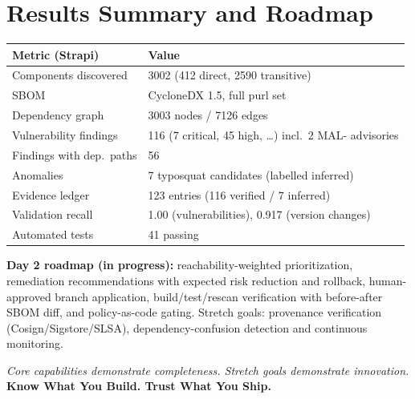 \documentclass[11pt,a4paper]{article}
\begin{document}
\section{Results Summary and Roadmap}

\begin{center}
\small
\begin{tabular}{@{}ll@{}}
\toprule
\textbf{Metric (Strapi)} & \textbf{Value} \\
\midrule
Components discovered      & 3002 (412 direct, 2590 transitive) \\
SBOM                       & CycloneDX 1.5, full purl set \\
Dependency graph           & 3003 nodes / 7126 edges \\
Vulnerability findings     & 116 (7 critical, 45 high, \dots) incl.\ 2 MAL- advisories \\
Findings with dep.\ paths  & 56 \\
Anomalies                  & 7 typosquat candidates (labelled inferred) \\
Evidence ledger            & 123 entries (116 verified / 7 inferred) \\
Validation recall          & 1.00 (vulnerabilities), 0.917 (version changes) \\
Automated tests            & 41 passing \\
\bottomrule
\end{tabular}
\end{center}

\textbf{Day 2 roadmap (in progress):} reachability-weighted prioritization, remediation
recommendations with expected risk reduction and rollback, human-approved branch
application, build/test/rescan verification with before-after SBOM diff, and
policy-as-code gating. Stretch goals: provenance verification (Cosign/Sigstore/SLSA),
dependency-confusion detection and continuous monitoring.

\vspace{2em}
\begin{center}
\textit{Core capabilities demonstrate completeness. Stretch goals demonstrate innovation.}\\
\textbf{Know What You Build. Trust What You Ship.}
\end{center}
\end{document}
